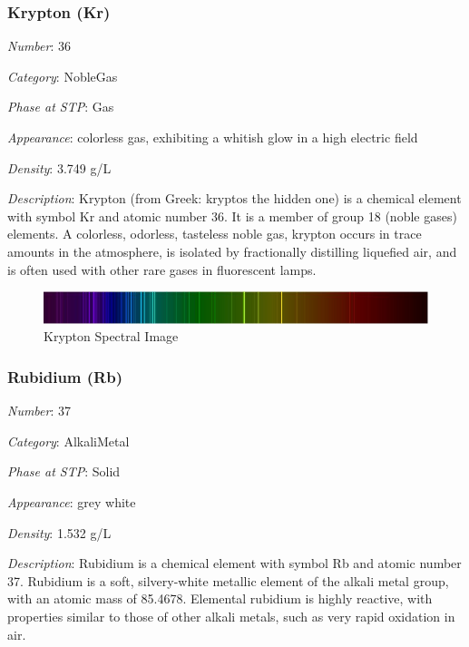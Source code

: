 \documentclass{article}
\begin{document}
\hypertarget{subsubsection::Kr}{}\subsubsection{Krypton (Kr)}

\textit{Number}: 36

\textit{Category}: NobleGas

\textit{Phase at STP}: Gas

\textit{Appearance}: colorless gas, exhibiting a whitish glow in a high electric field

\textit{Density}: 3.749 g/L

\textit{Description}: Krypton (from Greek: kryptos the hidden one) is a chemical element with symbol Kr and atomic number 36. It is a member of group 18 (noble gases) elements. A colorless, odorless, tasteless noble gas, krypton occurs in trace amounts in the atmosphere, is isolated by fractionally distilling liquefied air, and is often used with other rare gases in fluorescent lamps.

\immediate{}
\begin{figure}[!ht]
    \centering
    \includegraphics[width=12cm]{./resources/spectral_img/Krypton_Spectrum.jpg}
    \caption{Krypton Spectral Image}
\end{figure}

\hypertarget{subsubsection::Rb}{}\subsubsection{Rubidium (Rb)}

\textit{Number}: 37

\textit{Category}: AlkaliMetal

\textit{Phase at STP}: Solid

\textit{Appearance}: grey white

\textit{Density}: 1.532 g/L

\textit{Description}: Rubidium is a chemical element with symbol Rb and atomic number 37. Rubidium is a soft, silvery-white metallic element of the alkali metal group, with an atomic mass of 85.4678. Elemental rubidium is highly reactive, with properties similar to those of other alkali metals, such as very rapid oxidation in air.
\end{document}
